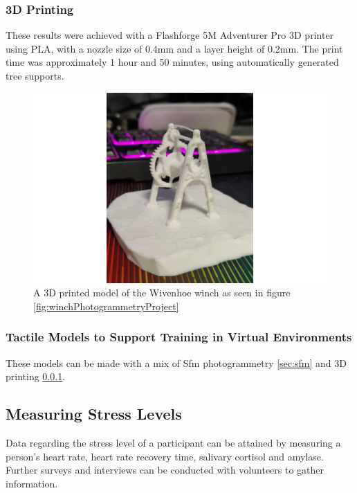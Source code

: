 \documentclass[12pt]{article}
\begin{document}
\subsubsection{3D Printing} \label{sec:3dprinting}

These results were achieved with a Flashforge 5M Adventurer Pro \cite{FlashForgeAdventurer5MPro} 3D printer using PLA, with a nozzle size of 0.4mm and a layer height of 0.2mm. The print time was approximately 1 hour and 50 minutes, using automatically generated tree supports.

\begin{figure}[h]
  \centering
  \begin{minipage}[b]{0.7\linewidth}
    \includegraphics[width=\linewidth]{images/winch 3d model.png}
    \caption{A 3D printed model of the Wivenhoe winch as seen in figure \ref{fig:winchPhotogrammetryProject}}
    \label{fig:winch3dmodel}
  \end{minipage}
\end{figure}

\subsubsection{Tactile Models to Support Training in Virtual Environments}

These models can be made with a mix of Sfm photogrammetry \ref{sec:sfm} and 3D printing \ref{sec:3dprinting}.

\subsection{Measuring Stress Levels}

Data regarding the stress level of a participant can be attained by measuring a person's heart rate, heart rate recovery time, salivary cortisol and amylase. Further surveys and interviews can be conducted with volunteers to gather information. \cite{liu2018impact}
\end{document}
